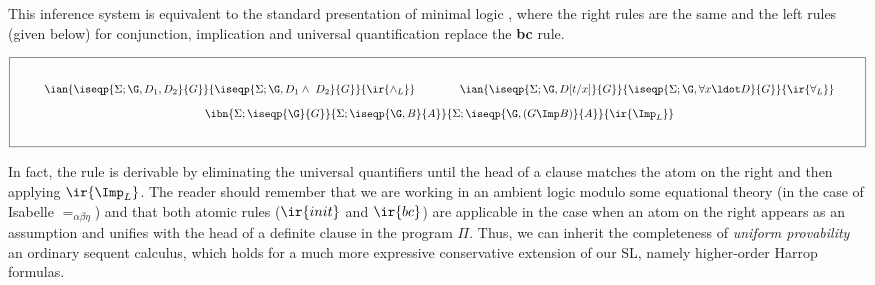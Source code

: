 \documentclass[final]{svjour3}
\begin{document}
This inference system is equivalent to the standard presentation of
minimal logic \cite{JoMinLog}, where the right rules are the same and
the left rules (given below) for conjunction, implication and universal
quantification replace the \textbf{bc} rule.

\[{\fboxsep=8mm\fbox{
$\begin{array}{c}
  \ian{\iseqp{\Sigma;\G,D_1,D_2}{G}}
       {\iseqp{\Sigma;\G,D_1\land\ D_2}{G}}
       {\ir{\land_L}} 
\qquad\qquad
 \ian{\iseqp{\Sigma;\G,D[t/x]}{G}}
  {\iseqp{\Sigma;\G,\forall x\ldot D}{G}}
       {\ir{\forall_L}}
\\[1em]
\ibn{\Sigma;\iseqp{\G}{G}}{\Sigma;\iseqp {\G,B}{A}}
       {\Sigma;\iseqp{\G, (G \Imp B)}{A}}
       {\ir{\Imp_L}}
\end{array}$}}
\]

\noindent
In fact, the  rule is derivable by eliminating the universal
quantifiers until the head of a clause matches the atom on the
right and then applying $\ir{\Imp_L}$. The reader should remember that
we are working in an ambient logic modulo some equational theory (in
the case of Isabelle $=_{\alpha\beta\eta}$) and that both atomic rules
($\ir{init}$ and $\ir{bc}$)
are applicable in the case when an atom on the right appears as an
assumption and unifies with the head of a definite clause in the
program $\Pi$.  Thus, we can inherit the completeness of \emph{uniform
  provability}~\cite{Miller91apal} \wrt an ordinary sequent calculus,
which holds for a much more expressive conservative extension of our
SL, namely higher-order Harrop formulas.
\end{document}
